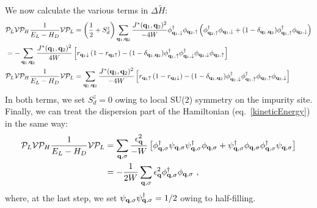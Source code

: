 \documentclass[reprint,hidelinks,onecolumn]{revtex4-2}
\begin{document}
We now calculate the various terms in \(\Delta \tilde H\):
\begin{equation}\begin{aligned}
	&\mathcal{P}_L \mathcal{V} \mathcal{P}_H\frac{1}{E_L - H_D} \mathcal{V} \mathcal{P}_L = \left(\frac{1}{2} + S_d^z\right) \sum_{{\bf q}_1,{\bf q}_2}\frac{{J^*({\bf q}_1,{\bf q}_2})^2}{-4W}\phi^\dagger_{{\bf q}_1,\downarrow}\phi_{{\bf q}_2, \uparrow} \left(\phi^\dagger_{{\bf q}_2,\uparrow}\phi_{{\bf q}_1, \downarrow} + (1 - \delta_{{\bf q}_1,{\bf q}_2})\phi^\dagger_{{\bf q}_1,\uparrow}\phi_{{\bf q}_2, \downarrow}\right)\\
	&= -\sum_{{\bf q}_1,{\bf q}_2}\frac{{J^*({\bf q}_1,{\bf q}_2})^2}{4W}\left[r_{{\bf q}_1 \downarrow} \left(1 - r_{{\bf q}_2 \uparrow}\right) - (1 - \delta_{{\bf q}_1,{\bf q}_2})\phi^\dagger_{{\bf q}_1,\uparrow}\phi^\dagger_{{\bf q}_1,\downarrow}\phi_{{\bf q}_2, \downarrow}\phi_{{\bf q}_2, \uparrow}\right]\\
	&\mathcal{P}_L \mathcal{V} \mathcal{P}_H\frac{1}{E_L - H_D} \mathcal{V} \mathcal{P}_L = \sum_{{\bf q}_1,{\bf q}_2}\frac{{J^*({\bf q}_1,{\bf q}_2})^2}{-4W}\left[r_{{\bf q}_1 \uparrow} \left(1 - r_{{\bf q}_2 \downarrow}\right) - (1 - \delta_{{\bf q}_1,{\bf q}_2})\phi^\dagger_{{\bf q}_1,\downarrow}\phi^\dagger_{{\bf q}_1,\uparrow}\phi_{{\bf q}_2, \uparrow}\phi_{{\bf q}_2, \downarrow}\right] \\
\end{aligned}\end{equation}
In both terms, we set \(S_d^z = 0\) owing to local SU(2) symmetry on the impurity site. Finally, we can treat the dispersion part of the Hamiltonian (eq.~\ref{kineticEnergy}) in the same way:
\begin{equation}\begin{aligned}
\mathcal{P}_L \mathcal{V} \mathcal{P}_H\frac{1}{E_L - H_D} \mathcal{V} \mathcal{P}_L &= \sum_{{\bf q},\sigma}\frac{\epsilon_{{\bf q}}^2}{-W}\left[\phi^\dagger_{{\bf q},\sigma}\psi_{{\bf q},\sigma}\psi^\dagger_{{\bf q},\sigma}\phi_{{\bf q},\sigma} + \psi^\dagger_{{\bf q},\sigma}\phi_{{\bf q},\sigma}\phi^\dagger_{{\bf q},\sigma}\psi_{{\bf q},\sigma}\right] \\
&= -\frac{1}{2W}\sum_{{\bf q},\sigma}\epsilon_{{\bf q}}^2\phi^\dagger_{{\bf q},\sigma}\phi_{{\bf q},\sigma}~,
\end{aligned}\end{equation}
where, at the last step, we set \(\psi_{{\bf q},\sigma}\psi^\dagger_{{\bf q},\sigma} = 1/2\) owing to half-filling.
\end{document}
